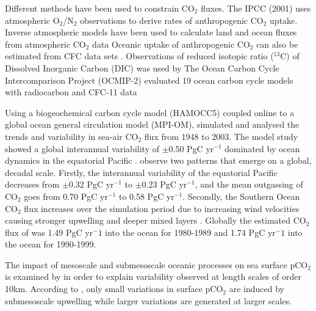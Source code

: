 \documentclass[11pt, a4paper]{article}
\numberwithin{figure}{section}
\numberwithin{table}{section}
\begin{document}
Different methods have been used to constrain CO$_2$ fluxes. 
The IPCC (2001) uses atmospheric O$_2$/N$_2$ observations 
\citep{(Keeling and Shertz, 1992)} 
to derive rates of anthropogenic CO$_2$ uptake. 
Inverse atmospheric models have been used to calculate land and ocean 
fluxes from atmospheric CO$_2$ data 
\citep{Gurney2002} %
Oceanic uptake of anthropogenic CO$_2$ can also be estimated from CFC data sets 
\cite{McNeil2003}.%
Observations of reduced isotopic ratio ($^{13}$C) of Dissolved 
Inorganic Carbon (DIC) was used by 
\citet{gruberandkeeling2001}%
The Ocean Carbon Cycle Intercomparison Project (OCMIP-2) evaluated 19 
ocean carbon cycle models with radiocarbon and CFC-11 data 
\cite{Matsumoto2004}%

Using a biogeochemical carbon cycle model (HAMOCC5) coupled online to 
a global ocean general circulation model (MPI-OM), 
\citet{Wetzel2005}%
simulated and 
analysed the trends and variability in sea-air CO$_2$ flux from 1948 to
2003.
The model study showed a global interannual variability of $\pm$0.50 
PgC yr$^{-1}$ dominated by ocean dynamics in the equatorial Pacific 
\citep{Wetzel2005}.%
\citet{Wetzel2005}%
observe two patterns that emerge on a global, decadal 
scale. 
Firstly, the interannual variability of the equatorial Pacific decreases 
from $\pm$0.32 PgC yr$^{-1}$ to $\pm$0.23 PgC yr$^{-1}$, and the mean 
outgassing of CO$_2$ goes from 0.70 PgC yr$^{-1}$ to 0.58 PgC yr$^{-1}$. 
Secondly, the Southern Ocean CO$_2$ flux increases over the simulation 
period due to increasing wind velocities causing stronger upwelling 
and deeper mixed layers 
\citep{Wetzel2005}. %
Globally the estimated CO$_2$ flux of 
\citet{Wetzel2005} %
was 1.49 PgC yr$^-1$ 
into the ocean for 1980-1989 and 1.74 PgC yr$^-1$ into the ocean for 1990-1999.

The impact of mesoscale and submesoscale oceanic processes on sea surface 
pCO${_2}$ is examined by 
\citet{Mahadevan2004} %
in order to explain 
variability observed at length scales of order 10km. 
According to 
\cite{Mahadevan2004} %
, only small variations in surface pCO$_2$ are induced by 
submesoscale upwelling while larger variations are generated at larger scales.
\end{document}
